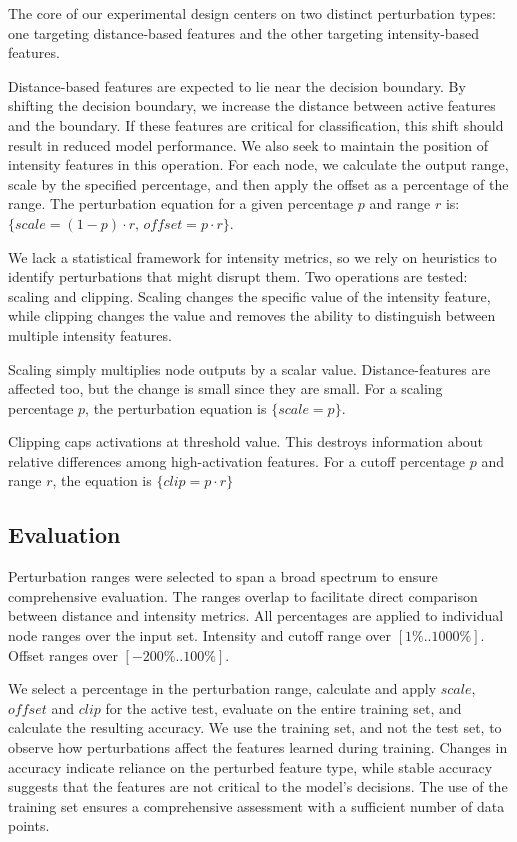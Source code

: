 The core of our experimental design centers on two distinct perturbation types: one targeting distance-based features and the other targeting intensity-based features.

Distance-based features are expected to lie near the decision boundary. By shifting the decision boundary, we increase the distance between active features and the boundary. If these features are critical for classification, this shift should result in reduced model performance. We also seek to maintain the position of intensity features in this operation. For each node, we calculate the output range, scale by the specified percentage, and then apply the offset as a percentage of the range. The perturbation equation for a given percentage $p$ and range $r$ is: $\{scale = (1-p) \cdot r,\, offset = p \cdot r \}$.

We lack a statistical framework for intensity metrics, so we rely on heuristics to identify perturbations that might disrupt them. Two operations are tested: scaling and clipping. Scaling changes the specific value of the intensity feature, while clipping changes the value and removes the ability to distinguish between multiple intensity features.

Scaling simply multiplies node outputs by a scalar value. Distance-features are affected too, but the change is small since they are small. For a scaling percentage $p$, the perturbation equation is $\{scale = p\}$.

Clipping caps activations at threshold value. This destroys information about relative differences among high-activation features. For a cutoff percentage $p$ and range $r$, the equation is $\{clip = p \cdot r\}$

\subsection{Evaluation}

Perturbation ranges were selected to span a broad spectrum to ensure comprehensive evaluation. The ranges overlap to facilitate direct comparison between distance and intensity metrics. All percentages are applied to individual node ranges over the input set. Intensity and cutoff range over $[1\%..1000\%]$. Offset ranges over $[-200\%..100\%]$.

We select a percentage in the perturbation range, calculate and apply $scale$, $offset$ and $clip$ for the active test, evaluate on the entire training set, and calculate the resulting accuracy. We use the training set, and not the test set, to observe how perturbations affect the features learned during training. Changes in accuracy indicate reliance on the perturbed feature type, while stable accuracy suggests that the features are not critical to the model's decisions. The use of the training set ensures a comprehensive assessment with a sufficient number of data points.
